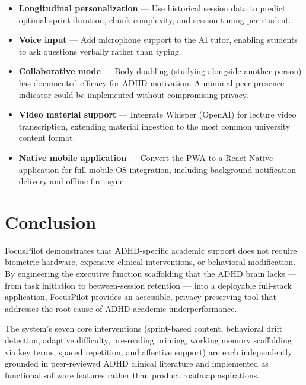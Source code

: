\documentclass[conference]{IEEEtran}
\begin{document}
\begin{itemize}
  \item \textbf{Longitudinal personalization} — Use historical session data to predict optimal sprint duration, chunk complexity, and session timing per student.

  \item \textbf{Voice input} — Add microphone support to the AI tutor, enabling students to ask questions verbally rather than typing.

  \item \textbf{Collaborative mode} — Body doubling (studying alongside another person) has documented efficacy for ADHD motivation. A minimal peer presence indicator could be implemented without compromising privacy.

  \item \textbf{Video material support} — Integrate Whisper (OpenAI) for lecture video transcription, extending material ingestion to the most common university content format.

  \item \textbf{Native mobile application} — Convert the PWA to a React Native application for full mobile OS integration, including background notification delivery and offline-first sync.
\end{itemize}

\section{Conclusion}

FocusPilot demonstrates that ADHD-specific academic support does not require biometric hardware, expensive clinical interventions, or behavioral modification. By engineering the executive function scaffolding that the ADHD brain lacks — from task initiation to between-session retention — into a deployable full-stack application, FocusPilot provides an accessible, privacy-preserving tool that addresses the root cause of ADHD academic underperformance.

The system's seven core interventions (sprint-based content, behavioral drift detection, adaptive difficulty, pre-reading priming, working memory scaffolding via key terms, spaced repetition, and affective support) are each independently grounded in peer-reviewed ADHD clinical literature and implemented as functional software features rather than product roadmap aspirations.
\end{document}
